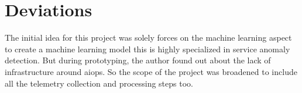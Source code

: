 \section{Deviations}

The initial idea for this project was solely forces on the machine learning aspect to create a machine learning model this is highly specialized in service anomaly detection. But during prototyping, the author found out about the lack of infrastructure around \ac{aiops}. So the scope of the project was broadened to include all the telemetry collection and processing steps too.